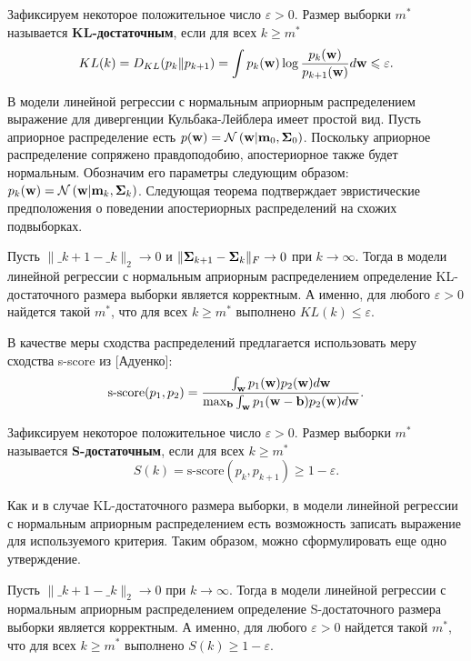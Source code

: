 \begin{definition}
    Зафиксируем некоторое положительное число $\varepsilon > 0$. Размер выборки $m^*$ называется \textbf{KL-достаточным}, если для всех $k \geqslant m^*$
    \[ KL(k) = D_{KL}(p_k \| p_{k+1}) = \int p_k(\mathbf{w}) \log{\dfrac{p_k(\mathbf{w})}{p_{k+1}(\mathbf{w})}} d\mathbf{w} \leqslant \varepsilon. \]
\end{definition}

В модели линейной регрессии с нормальным априорным распределением выражение для дивергенции Кульбака-Лейблера имеет простой вид. Пусть априорное распределение есть $p(\mathbf{w}) = \mathcal{N}\left( \mathbf{w} | \mathbf{m}_0, \boldsymbol{\Sigma}_0 \right)$. Поскольку априорное распределение сопряжено правдоподобию, апостериорное также будет нормальным. Обозначим его параметры следующим образом: $p_k(\mathbf{w}) = \mathcal{N}\left( \mathbf{w} | \mathbf{m}_k, \boldsymbol{\Sigma}_k \right)$. Следующая теорема подтверждает эвристические предположения о поведении апостериорных распределений на схожих подвыборках.

\begin{theorem}[Киселев, 2024]\label{theorem2}
    Пусть $\| \bm_{k+1} - \bm_k \|_2 \to 0$ и $\| \boldsymbol{\Sigma}_{k+1} - \boldsymbol{\Sigma}_k \|_{F} \to 0$ при $k \to \infty$. Тогда в модели линейной регрессии с нормальным априорным распределением определение KL-достаточного размера выборки является корректным. А именно, для любого $\varepsilon > 0$ найдется такой $m^*$, что для всех $k \geqslant m^*$ выполнено $KL(k) \leqslant \varepsilon$.
\end{theorem}

В качестве меры сходства распределений предлагается использовать меру сходства s-score из [Адуенко]:
\[ \text{s-score}(p_1, p_2) = \dfrac{\int_{\mathbf{w}} p_1(\mathbf{w}) p_2(\mathbf{w}) d\mathbf{w}}{\max_{\mathbf{b}} \int_{\mathbf{w}} p_1(\mathbf{w} - \mathbf{b}) p_2(\mathbf{w}) d\mathbf{w}}. \]

\begin{definition}
    Зафиксируем некоторое положительное число $\varepsilon > 0$. Размер выборки $m^*$ называется \textbf{S-достаточным}, если для всех $k \geqslant m^*$
    \[ S(k) = \text{s-score}(p_k, p_{k+1}) \geqslant 1-\varepsilon. \]
\end{definition}

Как и в случае KL-достаточного размера выборки, в модели линейной регрессии с нормальным априорным распределением есть возможность записать выражение для используемого критерия. Таким образом, можно сформулировать еще одно утверждение.

\begin{theorem}[Киселев, 2024]\label{theorem3}
    Пусть $\| \bm_{k+1} - \bm_k \|_2 \to 0$ при $k \to \infty$. Тогда в модели линейной регрессии с нормальным априорным распределением определение S-достаточного размера выборки является корректным. А именно, для любого $\varepsilon > 0$ найдется такой $m^*$, что для всех $k \geqslant m^*$ выполнено $S(k) \geqslant 1-\varepsilon$.
\end{theorem}